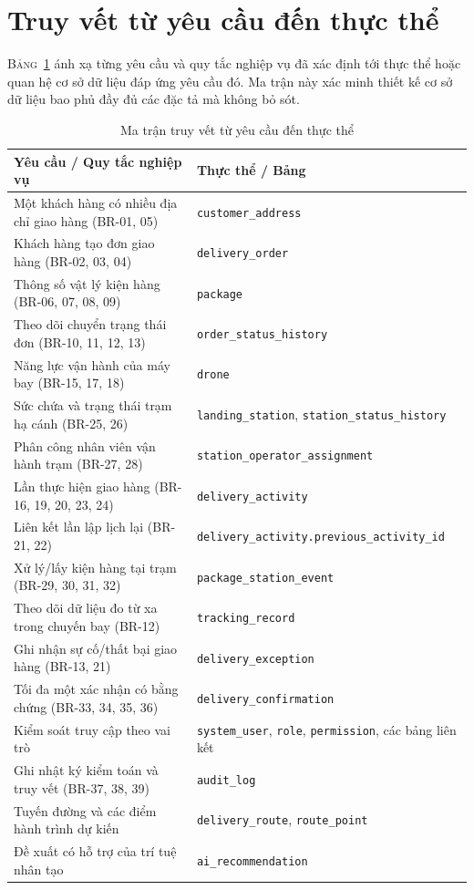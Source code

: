 \section{Truy vết từ yêu cầu đến thực thể}\label{s:traceability}

\textsc{Bảng}~\ref{tab:traceability} ánh xạ từng yêu cầu và quy tắc nghiệp vụ đã xác định tới thực thể hoặc quan hệ cơ sở dữ liệu đáp ứng yêu cầu đó. Ma trận này xác minh thiết kế cơ sở dữ liệu bao phủ đầy đủ các đặc tả mà không bỏ sót.

\begin{table}[h]
\caption{Ma trận truy vết từ yêu cầu đến thực thể}
\label{tab:traceability}

\begin{tabularx}{\textwidth}{@{\extracolsep{\fill}} p{8cm} p{8cm}}
\toprule
\textbf{Yêu cầu / Quy tắc nghiệp vụ} & \textbf{Thực thể / Bảng} \\
\midrule
Một khách hàng có nhiều địa chỉ giao hàng (BR-01, 05) & \texttt{customer\_address}  \\
Khách hàng tạo đơn giao hàng (BR-02, 03, 04) & \texttt{delivery\_order}  \\
Thông số vật lý kiện hàng (BR-06, 07, 08, 09) & \texttt{package}  \\
Theo dõi chuyển trạng thái đơn (BR-10, 11, 12, 13) & \texttt{order\_status\_history}  \\
Năng lực vận hành của máy bay (BR-15, 17, 18) & \texttt{drone} \\
Sức chứa và trạng thái trạm hạ cánh (BR-25, 26) & \texttt{landing\_station}, \texttt{station\_status\_history} \\
Phân công nhân viên vận hành trạm (BR-27, 28) & \texttt{station\_operator\_assignment}  \\
Lần thực hiện giao hàng (BR-16, 19, 20, 23, 24) & \texttt{delivery\_activity}  \\
Liên kết lần lập lịch lại (BR-21, 22) & \texttt{delivery\_activity.previous\_activity\_id}  \\
Xử lý/lấy kiện hàng tại trạm (BR-29, 30, 31, 32) & \texttt{package\_station\_event} \\
Theo dõi dữ liệu đo từ xa trong chuyến bay (BR-12) & \texttt{tracking\_record}  \\
Ghi nhận sự cố/thất bại giao hàng (BR-13, 21) & \texttt{delivery\_exception}  \\
Tối đa một xác nhận có bằng chứng (BR-33, 34, 35, 36) & \texttt{delivery\_confirmation}  \\
Kiểm soát truy cập theo vai trò & \texttt{system\_user}, \texttt{role}, \texttt{permission}, các bảng liên kết  \\
Ghi nhật ký kiểm toán và truy vết (BR-37, 38, 39) & \texttt{audit\_log}  \\
Tuyến đường và các điểm hành trình dự kiến & \texttt{delivery\_route}, \texttt{route\_point}  \\
Đề xuất có hỗ trợ của trí tuệ nhân tạo & \texttt{ai\_recommendation} \\
\bottomrule
\end{tabularx}
\end{table}